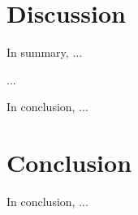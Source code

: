 \documentclass[a4paper, 12pt, epic, carom]{article}
\begin{document}
\section{Discussion}
In summary, ...

...

In conclusion, ...

\newpage




%
%
%

\section{Conclusion}
In conclusion, ...
 




%
%

\begin{flushleft}
{\newpage}
%
%
 
\begin{thebibliography}{99}

%







\end{thebibliography}
\end{flushleft}
\end{document}
